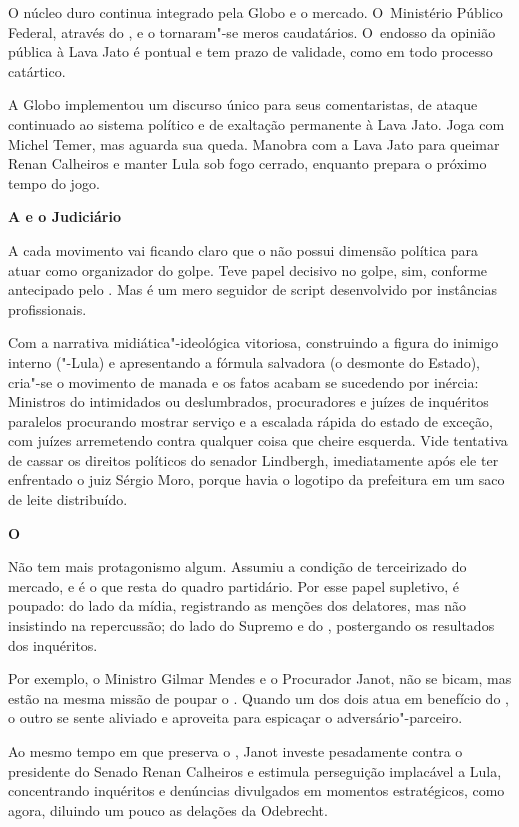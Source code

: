 O núcleo duro continua integrado pela Globo e o mercado. O~Ministério
Público Federal, através do , e o  tornaram"-se meros caudatários.
O~endosso da opinião pública à Lava Jato é pontual e tem prazo de
validade, como em todo processo catártico.

A Globo implementou um discurso único para seus comentaristas, de ataque
continuado ao sistema político e de exaltação permanente à Lava Jato.
Joga com Michel Temer, mas aguarda sua queda. Manobra com a Lava Jato
para queimar Renan Calheiros e manter Lula sob fogo cerrado, enquanto
prepara o próximo tempo do jogo.

\textbf{A  e o Judiciário}

A cada movimento vai ficando claro que o  não possui dimensão
política para atuar como organizador do golpe. Teve papel decisivo no
golpe, sim, conforme antecipado pelo . Mas é um mero seguidor de
script desenvolvido por instâncias profissionais.

Com a narrativa midiática"-ideológica vitoriosa, construindo a figura do
inimigo interno ("-Lula) e apresentando a fórmula salvadora (o desmonte
do Estado), cria"-se o movimento de manada e os fatos acabam se sucedendo
por inércia: Ministros do  intimidados ou deslumbrados, procuradores
e juízes de inquéritos paralelos procurando mostrar serviço e a escalada
rápida do estado de exceção, com juízes arremetendo contra qualquer
coisa que cheire esquerda. Vide tentativa de cassar os direitos
políticos do senador Lindbergh, imediatamente após ele ter enfrentado o
juiz Sérgio Moro, porque havia o logotipo da prefeitura em um saco de
leite distribuído.

\textbf{O }

Não tem mais protagonismo algum. Assumiu a condição de terceirizado do
mercado, e é o que resta do quadro partidário. Por esse papel supletivo,
é poupado: do lado da mídia, registrando as menções dos delatores, mas
não insistindo na repercussão; do lado do Supremo e do , postergando
os resultados dos inquéritos.

Por exemplo, o Ministro Gilmar Mendes e o Procurador Janot, não se
bicam, mas estão na mesma missão de poupar o . Quando um dos dois
atua em benefício do , o outro se sente aliviado e aproveita para
espicaçar o adversário"-parceiro.

Ao mesmo tempo em que preserva o , Janot investe pesadamente contra
o presidente do Senado Renan Calheiros e estimula perseguição implacável
a Lula, concentrando inquéritos e denúncias divulgados em momentos
estratégicos, como agora, diluindo um pouco as delações da Odebrecht.

